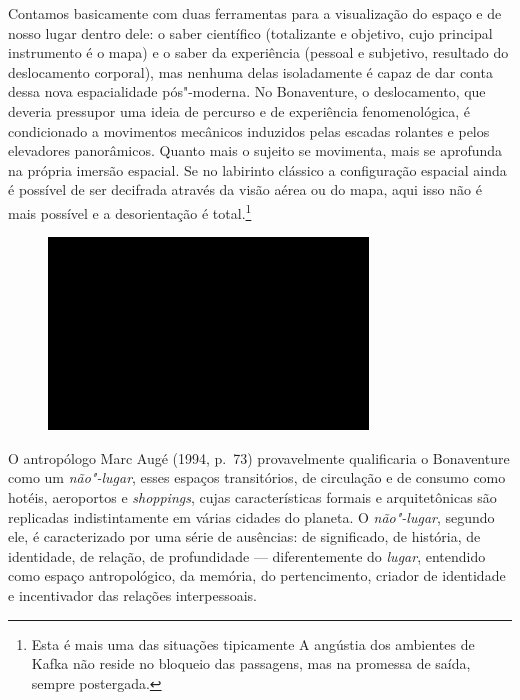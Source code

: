 Contamos basicamente com duas ferramentas para a visualização do espaço
e de nosso lugar dentro dele: o saber científico (totalizante e
objetivo, cujo principal instrumento é o mapa) e o saber da experiência
(pessoal e subjetivo, resultado do deslocamento corporal), mas nenhuma
delas isoladamente é capaz de dar conta dessa nova espacialidade
pós"-moderna. No Bonaventure, o deslocamento, que deveria pressupor uma
ideia de percurso e de experiência fenomenológica, é condicionado a
movimentos mecânicos induzidos pelas escadas rolantes e pelos elevadores
panorâmicos. Quanto mais o sujeito se movimenta, mais se aprofunda na
própria imersão espacial. Se no labirinto clássico a configuração
espacial ainda é possível de ser decifrada através da visão aérea ou do
mapa, aqui isso não é mais possível e a desorientação é total.\footnote{Esta
  é mais uma das situações tipicamente {} A angústia dos
  ambientes de Kafka não reside no bloqueio das passagens, mas na
  promessa de saída, sempre postergada.}

\begin{figure}[!ht]

\centering
 \includegraphics[width=85mm]{./imgs/im1.jpg}
\caption{\tiny{}}

\end{figure}

O antropólogo Marc Augé (1994, p.~73) provavelmente qualificaria o
Bonaventure como um \emph{não"-lugar}, esses espaços transitórios, de
circulação e de consumo como hotéis, aeroportos e \emph{shoppings},
cujas características formais e arquitetônicas são replicadas
indistintamente em várias cidades do planeta. O \emph{não"-lugar},
segundo ele, é caracterizado por uma série de ausências: de significado,
de história, de identidade, de relação, de profundidade ---
diferentemente do \emph{lugar}, entendido como espaço antropológico, da
memória, do pertencimento, criador de identidade e incentivador das
relações interpessoais.


